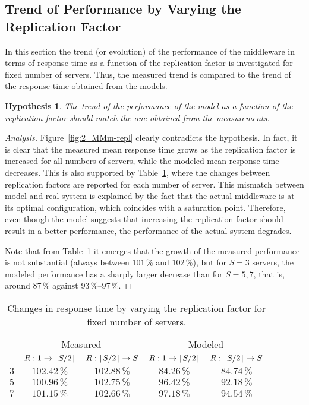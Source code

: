 \documentclass[11pt]{article}
\DeclarePairedDelimiter{\ceil}{\lceil}{\rceil}
\newtheorem{hyp}{Hypothesis}
\theoremstyle{definition}
\newenvironment{ana}[1][\proofname]{\begin{proof}[Analysis]}{\end{proof}}
\begin{document}
\subsection{Trend of Performance by Varying the Replication Factor}

In this section the trend (or evolution) of the performance of the middleware in terms of response time as a function of the replication factor is investigated for fixed number of servers.
Thus, the measured trend is compared to the trend of the response time obtained from the models.

\begin{hyp}
    \label{hyp:2-1}
    The trend of the performance of the model as a function of the replication factor should match the one obtained from the measurements.
\end{hyp}
\begin{ana}
    Figure~\ref{fig:2_MMm-repl} clearly contradicts the hypothesis.
    In fact, it is clear that the measured mean response time grows as the replication factor is increased for all numbers of servers, while the modeled mean response time decreases.
    This is also supported by Table~\ref{tab:2_repl_trend}, where the changes between replication factors are reported for each number of server.
    This mismatch between model and real system is explained by the fact that the actual middleware is at its optimal configuration, which coincides with a saturation point.
    Therefore, even though the model suggests that increasing the replication factor should result in a better performance, the performance of the actual system degrades.
    
    Note that from Table~\ref{tab:2_repl_trend} it emerges that the growth of the measured performance is not substantial (always between $101\,\%$ and $102\,\%$), but for $S=3$ servers, the modeled performance has a sharply larger decrease than for $S=5,7$, that is, around $87\,\%$ against $93\,\%$--$97\,\%$.
\end{ana}

\begin{table}[h]
    \centering
    \small
    {
        \begin{tabular}{|c||c|c||c|c|}
            \hline
            \rowcolor{Gray} & \multicolumn{2}{c||}{Measured} & \multicolumn{2}{c|}{Modeled} \\
            \hhline{|~||-|-||-|-|}
            \rowcolor{Gray} \multirow{-2}{*}{$S$}& $R:1\to\ceil{S/2}$ & $R:\ceil{S/2}\to S$ & $R:1\to\ceil{S/2}$ & $R:\ceil{S/2}\to S$ \\
            \hline
            $3$ & $102.42\,\%$ & $102.88\,\%$ & $84.26\,\%$ & $84.74\,\%$ \\
            $5$ & $100.96\,\%$ & $102.75\,\%$ & $96.42\,\%$ & $92.18\,\%$ \\
            $7$ & $101.15\,\%$ & $102.66\,\%$ & $97.18\,\%$ & $94.54\,\%$ \\
            \hline
        \end{tabular}
    }
    \caption{Changes in response time by varying the replication factor for fixed number of servers.}
    \label{tab:2_repl_trend}
\end{table}
\end{document}
